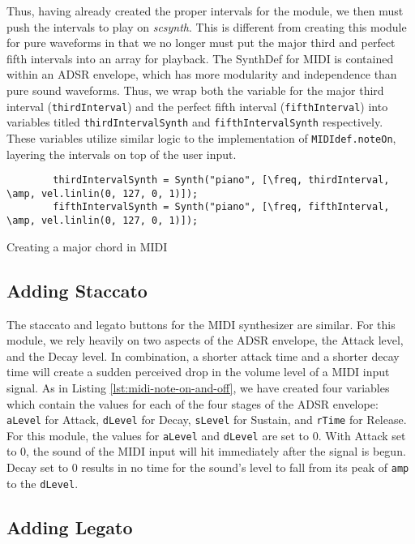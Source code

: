 Thus, having already created the proper intervals for the module, we then must push the intervals to play on \textit{scsynth}. This is different from creating this module for pure waveforms in that we no longer must put the major third and perfect fifth intervals into an array for playback. The SynthDef for MIDI is contained within an ADSR envelope, which has more modularity and independence than pure sound waveforms. Thus, we wrap both the variable for the major third interval (\texttt{thirdInterval}) and the perfect fifth interval (\texttt{fifthInterval}) into variables titled \texttt{thirdIntervalSynth} and \texttt{fifthIntervalSynth} respectively. These variables utilize similar logic to the implementation of \texttt{MIDIdef.noteOn}, layering the intervals on top of the user input.

\begin{listing}
	\begin{lstlisting}
		thirdIntervalSynth = Synth("piano", [\freq, thirdInterval, \amp, vel.linlin(0, 127, 0, 1)]);
		fifthIntervalSynth = Synth("piano", [\freq, fifthInterval, \amp, vel.linlin(0, 127, 0, 1)]);
	\end{lstlisting}
	\label{lst:midi-maj-chord}
	\caption{Creating a major chord in MIDI}
\end{listing}

\subsection{Adding Staccato}

The staccato and legato buttons for the MIDI synthesizer are similar. For this module, we rely heavily on two aspects of the ADSR envelope, the Attack level, and the Decay level. In combination, a shorter attack time and a shorter decay time will create a sudden perceived drop in the volume level of a MIDI input signal. As in Listing \ref{lst:midi-note-on-and-off}, we have created four variables which contain the values for each of the four stages of the ADSR envelope: \texttt{aLevel} for Attack, \texttt{dLevel} for Decay, \texttt{sLevel} for Sustain, and \texttt{rTime} for Release. For this module, the values for \texttt{aLevel} and \texttt{dLevel} are set to 0. With Attack set to 0, the sound of the MIDI input will hit immediately after the signal is begun. Decay set to 0 results in no time for the sound's level to fall from its peak of \texttt{amp} to the \texttt{dLevel}.

\subsection{Adding Legato}

